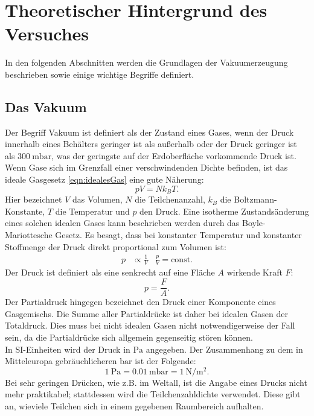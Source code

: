 \section{Theoretischer Hintergrund des Versuches}
\label{sec:Theorie}
In den folgenden Abschnitten werden die Grundlagen der Vakuumerzeugung beschrieben
sowie einige wichtige Begriffe definiert.

\subsection{Das Vakuum}
Der Begriff Vakuum ist definiert als der Zustand eines Gases, wenn der Druck
innerhalb eines Behälters geringer ist als außerhalb oder der Druck geringer
ist als $\SI{300}{\milli\bar}$, was der geringste auf der Erdoberfläche
vorkommende Druck ist.\\
Wenn Gase sich im Grenzfall einer verschwindenden Dichte befinden, ist das
ideale Gasgesetz \ref{eqn:idealesGas} eine gute Näherung:
\begin{equation}
 pV = N k_{B} T.
 \label{eqn:idealesGas}
\end{equation}
Hier bezeichnet $V$ das Volumen, $N$ die Teilchenanzahl, $k_{B}$ die
Boltzmann-Konstante, $T$ die Temperatur und $p$ den Druck.
Eine isotherme Zustandsänderung eines solchen idealen Gases kann beschrieben
werden durch das Boyle-Mariottesche Gesetz.
Es besagt, dass bei konstanter Temperatur und konstanter Stoffmenge der Druck direkt
proportional zum Volumen ist:
\begin{align}
  p & \propto \frac{1}{V} & \frac{p}{V} = \text{const}.
  \label{eqn:boylemariotte}
\end{align}
Der Druck ist definiert als eine senkrecht auf eine Fläche $A$ wirkende Kraft $F$:
\begin{equation}
  p = \frac{F}{A}.
  \label{eqn:druck}
\end{equation}
Der Partialdruck hingegen bezeichnet den Druck einer Komponente eines Gasgemischs.
Die Summe aller Partialdrücke ist daher bei idealen Gasen der Totaldruck. Dies
muss bei nicht idealen Gasen nicht notwendigerweise der Fall sein, da die Partialdrücke
sich allgemein gegenseitig stören können.\\
In SI-Einheiten wird der Druck in $\si{\pascal}$ angegeben. Der Zusammenhang zu dem
in Mitteleuropa gebräuchlicheren $\si{\bar}$ ist der Folgende:
\begin{equation}
 \SI{1}{\pascal} = \SI{0.01}{\milli\bar} = \SI{1}{\newton\per\square\meter}.
\end{equation}
Bei sehr geringen Drücken, wie z.B. im Weltall, ist die Angabe eines Drucks nicht
mehr praktikabel; stattdessen wird die Teilchenzahldichte verwendet. Diese gibt an,
wieviele Teilchen sich in einem gegebenen Raumbereich aufhalten.

